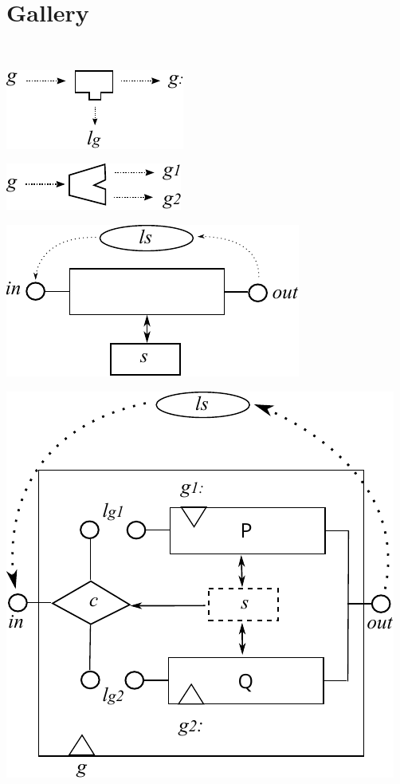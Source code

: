 \section{Gallery}\label{sec:gallery}
~

\parbox{3in}{\includegraphics{images/new-label}}
\begin{minipage}{3in}
\parbox{3in}{\includegraphics{images/split-gen}}
\end{minipage}

  \parbox{1.2in}{\includegraphics[scale=0.7]{images/atomic-action}}%
  \begin{minipage}{1.2in}%
    \includegraphics[scale=0.5]{images/conditional-actual}
  \end{minipage}%

